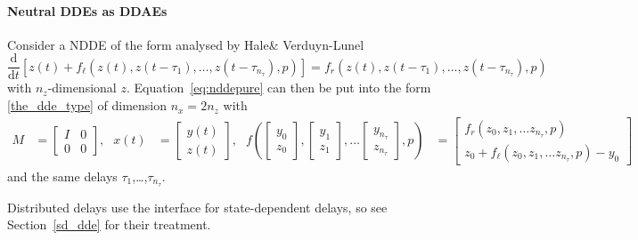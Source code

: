 \documentclass[10pt]{scrartcl}
\renewcommand{\d}{\mathrm{d}}
\begin{document}
\paragraph{Neutral DDEs as DDAEs}
Consider a
NDDE of the form analysed by Hale\& Verduyn-Lunel \cite{Hale93}
\begin{equation}
  \label{eq:nddepure}
  \frac{\d}{\d t}\left[z(t)+f_\ell(z(t),z(t-\tau_1),\ldots,z(t-\tau_{n_\tau}),p)\right]
  =f_r(z(t),z(t-\tau_1),\ldots,z(t-\tau_{n_\tau}),p)
\end{equation}
with $n_z$-dimensional $z$.
Equation~\eqref{eq:nddepure} can then be put into the form \eqref{the_dde_type} of dimension $n_x=2n_z$ with
\begin{align*}
  M&=
  \begin{bmatrix}
    I&0 \\ 0&0 
  \end{bmatrix}\mbox{,}&
  x(t)&=
  \begin{bmatrix}
    y(t)\\ z(t)
  \end{bmatrix}\mbox{,}&
  f\left(
    \begin{bmatrix}
      y_0\\ z_0
    \end{bmatrix}
,     \begin{bmatrix}
      y_1\\ z_1
    \end{bmatrix}
    ,\ldots
        \begin{bmatrix}
      y_{n_\tau}\\ z_{n_\tau}
    \end{bmatrix},p\right)&=
  \begin{bmatrix}
    f_r(z_0,z_1,\ldots z_{n_\tau},p)\\
    z_0+f_\ell(z_0,z_1,\ldots z_{n_\tau},p)-y_0
  \end{bmatrix}
\end{align*}
and the same delays $\tau_1$,\ldots,$\tau_{n_\tau}$.

Distributed delays use the interface for state-dependent delays, so
see Section~\ref{sd_dde} for their treatment.
\end{document}
